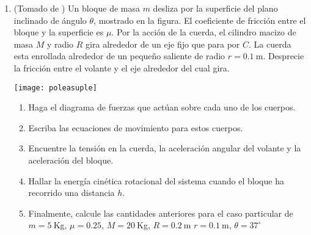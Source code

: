 \begin{enumerate}
\item (Tomado de \cite{gabriel}) Un bloque de masa $m$ desliza por la superficie del plano inclinado de ángulo $\theta$, mostrado en la figura. El coeficiente de fricción entre el bloque y la superficie es $\mu$. Por la acción de la cuerda, el cilindro macizo de masa $M$ y radio $R$ gira alrededor de un eje fijo que para por $C$.  La cuerda esta enrollada alrededor de un pequeño saliente de radio $r=0.1\ $m. Desprecie la fricción entre el volante y el eje alrededor del cual gira. 

  \begin{minipage}{0.3\linewidth}
    \texttt{[image: poleasuple]}
  \end{minipage}
  \begin{minipage}{0.7\linewidth}
    \begin{enumerate}
    \item Haga el diagrama de fuerzas que actúan sobre cada uno de los cuerpos.
      \label{item:p3a}
    \item Escriba las ecuaciones de movimiento para estos cuerpos.
      \label{item:p3b}
    \item Encuentre la tensión en la cuerda, la aceleración angular del volante y la aceleración del bloque. 
      \label{item:p3c}
    \item Hallar la energía cinética rotacional del sistema cuando el bloque ha recorrido una distancia $h$. 
    \item Finalmente, calcule las cantidades anteriores para el caso particular de $m=5\ $Kg, $\mu=0.25$, $M=20\ $Kg, $R=0.2\ $m $r=0.1\ $m, $\theta=37^\circ$
    \end{enumerate}
  \end{minipage}


\end{enumerate}
